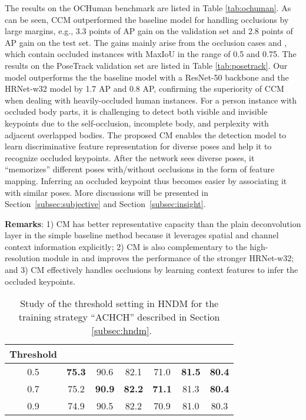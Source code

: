 \documentclass[twocolumn]{svjour3}          \smartqed  \usepackage{natbib}
\begin{document}
The results on the OCHuman benchmark are listed in Table \ref{tab:ochuman}. As can be seen, CCM outperformed the baseline model for handling occlusions by large margins, e.g., 3.3 points of AP gain on the validation set and 2.8 points of AP gain on the test set. The gains mainly arise from the occlusion cases  and , which contain occluded instances with MaxIoU in the range of 0.5 and 0.75. The results on the PoseTrack validation set are listed in Table \ref{tab:posetrack}. Our model outperforms the the baseline model with a ResNet-50 backbone and the HRNet-w32 model by 1.7 AP and 0.8 AP, confirming the superiority of CCM when dealing with heavily-occluded human instances. For a person instance with occluded body parts, it is challenging to detect both visible and invisible keypoints due to the self-occlusion, incomplete body, and perplexity with adjacent overlapped bodies. The proposed CM enables the detection model to learn discriminative feature representation for diverse poses and help it to recognize occluded keypoints. After the network sees diverse poses, it ``memorizes'' different poses with/without occlusions in the form of feature mapping. Inferring an occluded keypoint thus becomes easier by associating it with similar poses. More discussions will be presented in Section~\ref{subsec:subjective} and Section~\ref{subsec:insight}.

\textbf{Remarks}: 1) CM has better representative capacity than the plain deconvolution layer in the simple baseline method \citep{xiao2018simple} because it leverages spatial and channel context information explicitly; 2) CM is also complementary to the high-resolution module in \citep{sun2019deep} and improves the performance of the stronger HRNet-w32; and 3) CM effectively handles occlusions by learning context features to infer the occluded keypoints.

\begin{table}[htbp]
\centering
  \caption{Study of the threshold setting in HNDM for the training strategy ``ACHCH'' described in Section ~\ref{subsec:hndm}.}
    \begin{tabular}{ccccccc}
    \toprule
    Threshold    &     &   &   &    &  &  \\
    \midrule
    0.5  & \textbf{75.3}  & 90.6  & 82.1  & 71.0  & \textbf{81.5}  & \textbf{80.4}\\
    0.7 & 75.2  & \textbf{90.9}  & \textbf{82.2}  & \textbf{71.1}  & 81.3 & \textbf{80.4} \\
    0.9 & 74.9 & 90.5  & 82.2  & 70.9  & 81.0 & 80.3 \\
    \bottomrule
    \end{tabular}\label{tab:ablation_hnem_threshold}\end{table}
\end{document}
